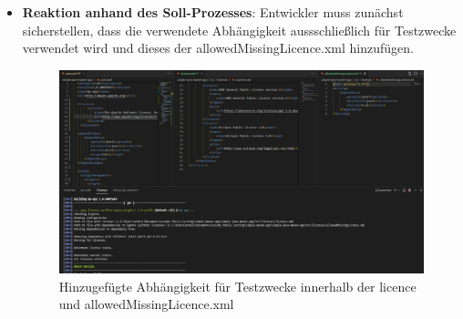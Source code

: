 \begin{itemize}
    \item \textbf{Reaktion anhand des Soll-Prozesses}: Entwickler muss zunächst sicherstellen, dass die verwendete Abhängigkeit aussschließlich für Testzwecke verwendet wird und dieses der allowedMissingLicence.xml hinzufügen. 
    
    \begin{figure}[h]
        \centering
        \includegraphics[scale=0.37]{Bilder/Fall5REaktion.png}
        \caption{Hinzugefügte Abhängigkeit für Testzwecke innerhalb der licence und allowedMissingLicence.xml}
    \end{figure}

\end{itemize}
